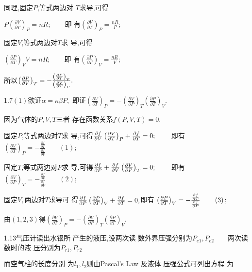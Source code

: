 \documentclass{ctexart}
\begin{document}
同理,固定$P$,等式两边对%
$T$求导,可得

$P\left( \frac{\partial V}{\partial T}\right) _{P}=nR;\qquad $即%
有\qquad $\left( \frac{\partial V}{\partial T}\right) _{P}=\frac{nR}{P}%
;$

固定$V$,等式两边对$T$求%
导,可得

$\left( \frac{\partial P}{\partial T}\right) _{V}V=nR;\qquad $即%
有\qquad $\left( \frac{\partial P}{\partial T}\right) _{V}=\frac{nR}{V}%
;$

所以\qquad $\left( \frac{\partial P}{\partial V}\right) _{T}=-%
\frac{\left( \frac{\partial P}{\partial T}\right) _{V}}{\left( \frac{%
\partial V}{\partial T}\right) _{P}}.$

1.7\qquad $\left( 1\right) $欲证\qquad $\alpha =\kappa \beta P,$%
即证\qquad $\left( \frac{\partial V}{\partial T}\right)
_{P}=-\left( \frac{\partial V}{\partial P}\right) _{T}\left( \frac{\partial P%
}{\partial T}\right) _{V}.$

因为\qquad 气体的$P,V,T$三者%
存在函数关系\qquad $f\left( P,V,T\right)
=0.$

固定$P$,等式两边对$T$求%
导,可得\qquad $\frac{\partial f}{\partial V}\left( \frac{%
\partial V}{\partial T}\right) _{P}+\frac{\partial f}{\partial T}=0;\qquad $%
即有\qquad $\left( \frac{\partial V}{\partial T}\right) _{P}=-%
\frac{\frac{\partial f}{\partial T}}{\frac{\partial f}{\partial V}}\qquad
\left( 1\right) ;$

固定$T$,等式两边对$P$求%
导,可得$\frac{\partial f}{\partial P}+\frac{\partial f}{%
\partial V}\left( \frac{\partial V}{\partial P}\right) _{T}=0;\qquad $%
即有\qquad $\left( \frac{\partial V}{\partial P}\right) _{T}=-%
\frac{\frac{\partial f}{\partial P}}{\frac{\partial f}{\partial V}}\qquad
\left( 2\right) ;$

固定$V,$两边对$T$求导可%
得\qquad $\frac{\partial f}{\partial P}\left( \frac{\partial P}{%
\partial T}\right) _{V}+\frac{\partial f}{\partial T}=0,$即有%
\qquad $\left( \frac{\partial P}{\partial T}\right) _{V}=-\frac{\frac{%
\partial f}{\partial T}}{\frac{\partial f}{\partial P}}\qquad \left(
3\right) ;$

由$\left( 1,2,3\right) $得\qquad \qquad $\left( \frac{\partial V%
}{\partial T}\right) _{P}=-\left( \frac{\partial V}{\partial P}\right)
_{T}\left( \frac{\partial P}{\partial T}\right) _{V}.$

1.13\qquad 气压计读出水银所%
产生的液压,设两次读%
数外界压强分别为$%
P_{e1},P_{e2}\qquad $两次读数时的液%
压分别为\qquad $P_{r1},P_{r2}$

而空气柱的长度分别%
为$l_{1},l_{2}$则由Pascal's Law 及液体%
压强公式可列出方程%
为
\end{document}
